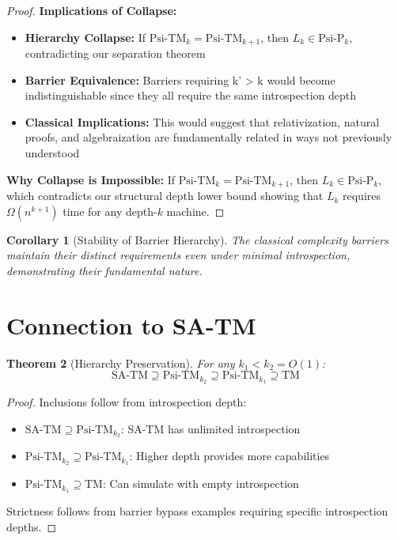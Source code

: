 \documentclass[11pt]{article}
\newtheorem{theorem}{Theorem}[section]
\newtheorem{corollary}[theorem]{Corollary}
\theoremstyle{definition}
\begin{document}
\begin{proof}
\textbf{Implications of Collapse:}
\begin{itemize}
\item \textbf{Hierarchy Collapse:} If $\text{Psi-TM}_k = \text{Psi-TM}_{k+1}$, then $L_k \in \text{Psi-P}_k$, contradicting our separation theorem
\item \textbf{Barrier Equivalence:} Barriers requiring k' > k would become indistinguishable since they all require the same introspection depth
\item \textbf{Classical Implications:} This would suggest that relativization, natural proofs, and algebraization are fundamentally related in ways not previously understood
\end{itemize}

\textbf{Why Collapse is Impossible:}
If $\text{Psi-TM}_k = \text{Psi-TM}_{k+1}$, then $L_k \in \text{Psi-P}_k$, which contradicts our structural depth lower bound showing that $L_k$ requires $\Omega(n^{k+1})$ time for any depth-$k$ machine.
\end{proof}

\begin{corollary}[Stability of Barrier Hierarchy]
The classical complexity barriers maintain their distinct requirements even under minimal introspection, demonstrating their fundamental nature.
\end{corollary}

\section{Connection to SA-TM}

\begin{theorem}[Hierarchy Preservation]
For any $k_1 < k_2 = O(1)$:
$$\text{SA-TM} \supseteq \text{Psi-TM}_{k_2} \supseteq \text{Psi-TM}_{k_1} \supseteq \text{TM}$$
\end{theorem}

\begin{proof}
Inclusions follow from introspection depth:
\begin{itemize}
\item $\text{SA-TM} \supseteq \text{Psi-TM}_{k_2}$: SA-TM has unlimited introspection
\item $\text{Psi-TM}_{k_2} \supseteq \text{Psi-TM}_{k_1}$: Higher depth provides more capabilities  
\item $\text{Psi-TM}_{k_1} \supseteq \text{TM}$: Can simulate with empty introspection
\end{itemize}
Strictness follows from barrier bypass examples requiring specific introspection depths.
\end{proof}
\end{document}
